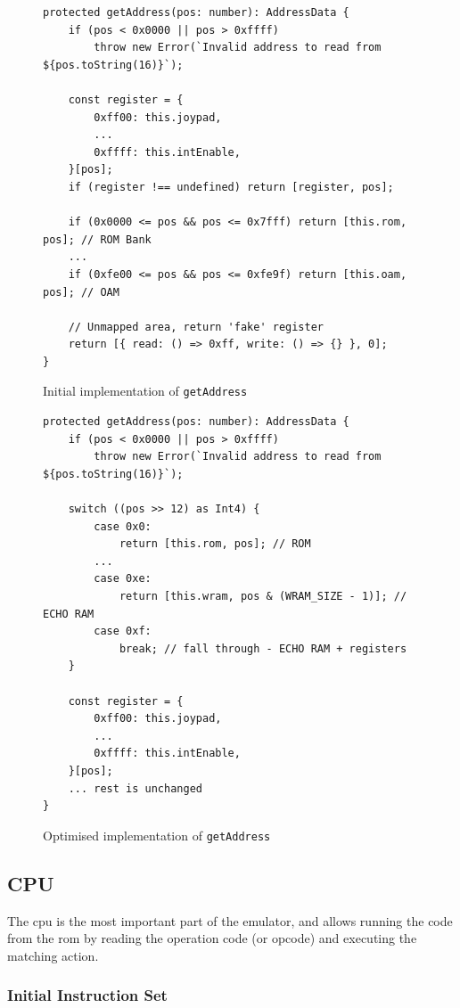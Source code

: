 \documentclass[11pt]{report}
\begin{document}
\begin{figure}[h]
    \begin{verbatim}
protected getAddress(pos: number): AddressData {
    if (pos < 0x0000 || pos > 0xffff)
        throw new Error(`Invalid address to read from ${pos.toString(16)}`);

    const register = {
        0xff00: this.joypad,
        ...
        0xffff: this.intEnable,
    }[pos];
    if (register !== undefined) return [register, pos];

    if (0x0000 <= pos && pos <= 0x7fff) return [this.rom, pos]; // ROM Bank
    ...
    if (0xfe00 <= pos && pos <= 0xfe9f) return [this.oam, pos]; // OAM

    // Unmapped area, return 'fake' register
    return [{ read: () => 0xff, write: () => {} }, 0];
}
    \end{verbatim}
    \caption{Initial implementation of \texttt{getAddress}}
    \label{fig:getaddress-before}
\end{figure}

\begin{figure}[h]
    \begin{verbatim}
protected getAddress(pos: number): AddressData {
    if (pos < 0x0000 || pos > 0xffff)
        throw new Error(`Invalid address to read from ${pos.toString(16)}`);

    switch ((pos >> 12) as Int4) {
        case 0x0:
            return [this.rom, pos]; // ROM
        ...
        case 0xe:
            return [this.wram, pos & (WRAM_SIZE - 1)]; // ECHO RAM
        case 0xf:
            break; // fall through - ECHO RAM + registers
    }

    const register = {
        0xff00: this.joypad,
        ...
        0xffff: this.intEnable,
    }[pos];
    ... rest is unchanged
}
    \end{verbatim}
    \caption{Optimised implementation of \texttt{getAddress}}
    \label{fig:getaddress-after}
\end{figure}

\clearpage
\subsection{CPU}

The \gls{cpu} is the most important part of the emulator, and allows running the code from the \gls{rom} by reading the operation code (or opcode) and executing the matching action.

\subsubsection{Initial Instruction Set}
\end{document}
